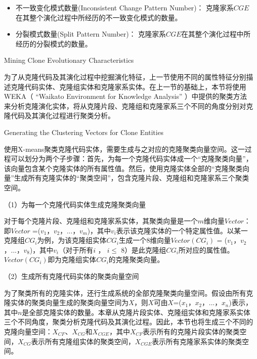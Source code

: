 \begin{itemize}
\item
不一致变化模式数量(Inconsistent Change Pattern Number)：
克隆家系{$CGE$}在其整个演化过程中所经历的不一致变化模式的数量。
\item
分裂模式数量(Split Pattern Number)：
克隆家系{$CGE$}在其整个演化过程中所经历的分裂模式的数量。
\end{itemize}

{Mining Clone Evolutionary Characteristics}

为了从克隆代码及其演化过程中挖掘演化特征，上一节使用不同的属性特征分别描述克隆代码实体、克隆组实体和克隆家系实体。在上一节的基础上，本节将使用WEKA（ “Waikato Environment for Knowledge Analysis” \cite{hall2009weka}）中提供的聚类方法来分析克隆演化实体，将从克隆片段、克隆组和克隆家系三个不同的角度分别对克隆代码及其演化过程进行聚类分析。

{Generating the Clustering Vectors for Clone Entities}

使用X-means聚类克隆代码实体，需要生成与之对应的克隆聚类向量空间。这一过程可以划分为两个子步骤：首先，为每一个克隆代码实体成一个“克隆聚类向量”，该向量包含某个克隆实体的所有属性值。然后，使用克隆实体全部的“克隆聚类向量”生成所有克隆实体的“聚类空间”，包含克隆片段、克隆组和克隆家系三个聚类空间。

（1）为每一个克隆代码实体生成克隆聚类向量

对于每个克隆片段、克隆组和克隆家系实体，其聚类向量是一个$m$维向量$Vector$：即{$Vector$ ={($v_1$，$v_2$，$...$，$v_m$)}}，其中$v_i$表示该克隆实体的一个特定属性值。以某一克隆组{$CG_i$}为例，为该克隆组实体{$CG_i$}生成一个8维向量{$Vector(CG_i)$ = ($v_1$，$v_2$，$...$，$v_8$)}，其中$v_i$（对于所有$i$ ， $i \leq $ 8）是此克隆组{$CG_i$}所对应的属性值。$Vector(CG_i)$即为克隆组实体{$CG_i$}的克隆聚类向量。
 
（2）生成所有克隆代码实体的聚类向量空间

为了聚类所有的克隆实体，还行生成系统的全部克隆聚类向量空间。假设由所有克隆实体的聚类向量生成的聚类向量空间为$X$，则$X$可由{$X$={($x_1$，$x_2$，$...$，$x_n$)}}表示，其中$n$是全部克隆实体的数量。本章从克隆片段实体、克隆组实体和克隆家系实体三个不同角度，聚类分析克隆代码及其演化过程。因此，本节也将生成三个不同的克隆向量空间：$X_{CF}$、$X_{CG}$和$X_{CGE}$，其中$X_{CF}$表示所有的克隆片段实体的聚类空间，$X_{CG}$表示所有克隆组实体的聚类空间，$X_{CGE}$表示所有克隆家系实体的聚类空间。

